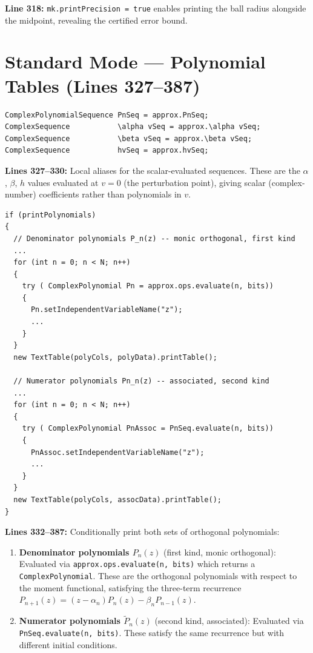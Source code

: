 \documentclass[a4paper,11pt]{article}
\begin{document}
\textbf{Line 318:} \texttt{mk.printPrecision = true} enables printing the ball
radius alongside the midpoint, revealing the certified error bound.

\section{Standard Mode --- Polynomial Tables (Lines 327--387)}

\begin{lstlisting}[firstnumber=327]
ComplexPolynomialSequence PnSeq = approx.PnSeq;
ComplexSequence           \alpha vSeq = approx.\alpha vSeq;
ComplexSequence           \beta vSeq = approx.\beta vSeq;
ComplexSequence           hvSeq = approx.hvSeq;
\end{lstlisting}

\textbf{Lines 327--330:} Local aliases for the scalar-evaluated sequences.
These are the $\alpha$, $\beta$, $h$ values evaluated at $v=0$ (the
perturbation point), giving scalar (complex-number) coefficients rather than
polynomials in $v$.

\newpage

\begin{lstlisting}[firstnumber=332]
if (printPolynomials)
{
  // Denominator polynomials P_n(z) -- monic orthogonal, first kind
  ...
  for (int n = 0; n < N; n++)
  {
    try ( ComplexPolynomial Pn = approx.ops.evaluate(n, bits))
    {
      Pn.setIndependentVariableName("z");
      ...
    }
  }
  new TextTable(polyCols, polyData).printTable();

  // Numerator polynomials Pn_n(z) -- associated, second kind
  ...
  for (int n = 0; n < N; n++)
  {
    try ( ComplexPolynomial PnAssoc = PnSeq.evaluate(n, bits))
    {
      PnAssoc.setIndependentVariableName("z");
      ...
    }
  }
  new TextTable(polyCols, assocData).printTable();
}
\end{lstlisting}

\textbf{Lines 332--387:} Conditionally print both sets of orthogonal
polynomials:

\begin{enumerate}[nosep]
\item \textbf{Denominator polynomials $P_n(z)$} (first kind, monic orthogonal):
  Evaluated via \texttt{approx.ops.evaluate(n, bits)} which returns a
  \texttt{ComplexPolynomial}. These are the orthogonal polynomials with respect
  to the moment functional, satisfying the three-term recurrence
  $P_{n+1}(z) = (z - \alpha_n) P_n(z) - \beta_n P_{n-1}(z)$.

\item \textbf{Numerator polynomials $\tilde P_n(z)$} (second kind, associated):
  Evaluated via \texttt{PnSeq.evaluate(n, bits)}. These satisfy the same
  recurrence but with different initial conditions.
\end{enumerate}
\end{document}

